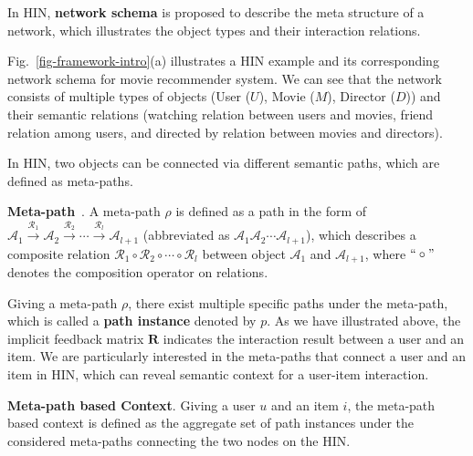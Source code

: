 In HIN,  \textbf{network schema} is proposed to describe the meta structure of a network, which illustrates the object types and their interaction relations.
\begin{exmp}
Fig.~\ref{fig-framework-intro}(a) illustrates a HIN example and its corresponding network schema for movie recommender system. We can see that the network consists of multiple types of
objects (\eg User ($U$), Movie ($M$), Director ($D$)) and their semantic relations (\eg watching relation between users and movies, friend relation among users, and directed by relation between movies and directors).
\end{exmp}

In HIN, two objects can be connected via different semantic paths, which are defined as meta-paths.
\begin{myDef}
\textbf{Meta-path}~\cite{sun2011pathsim}. A meta-path $\rho$ is defined as a path in the form of $\mathcal{A}_1 \xrightarrow{\mathcal{R}_1} \mathcal{A}_2 \xrightarrow{\mathcal{R}_2} \cdots \xrightarrow{\mathcal{R}_l} \mathcal{A}_{l+1}$ (abbreviated as $\mathcal{A}_1\mathcal{A}_2 \cdots \mathcal{A}_{l+1}$), which describes a composite relation $\mathcal{R}_1 \circ \mathcal{R}_2 \circ \cdots \circ \mathcal{R}_l$ between object $\mathcal{A}_1$ and $\mathcal{A}_{l+1}$, where $``\circ"$ denotes the composition operator on relations.
\end{myDef}

Giving a meta-path $\rho$, there exist multiple specific paths under the meta-path, which is called a \textbf{path instance} denoted by $p$.  As we have illustrated above, the implicit feedback matrix $\mathbf{R}$ indicates the interaction result between a user  and an item. We are particularly interested in the meta-paths that connect a user and an item in HIN, which can reveal semantic context for a user-item interaction.

\begin{myDef}
\textbf{Meta-path based Context}. Giving a user $u$ and an item $i$, the meta-path based context  is defined as the aggregate set of path instances under the considered meta-paths connecting the two nodes on the HIN.
\end{myDef}

